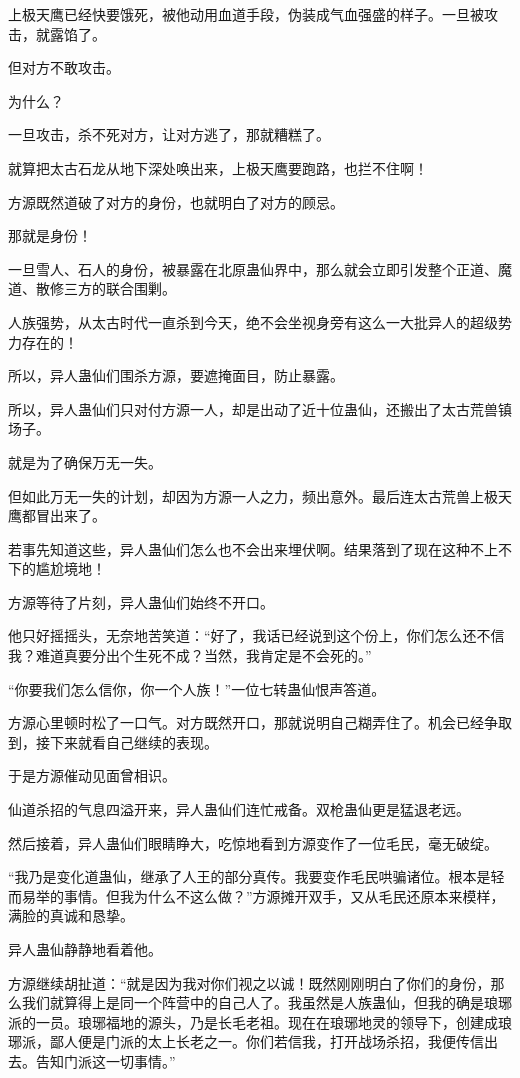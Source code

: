\begin{this_body}
上极天鹰已经快要饿死，被他动用血道手段，伪装成气血强盛的样子。一旦被攻击，就露馅了。

但对方不敢攻击。

为什么？

一旦攻击，杀不死对方，让对方逃了，那就糟糕了。

就算把太古石龙从地下深处唤出来，上极天鹰要跑路，也拦不住啊！

方源既然道破了对方的身份，也就明白了对方的顾忌。

那就是身份！

一旦雪人、石人的身份，被暴露在北原蛊仙界中，那么就会立即引发整个正道、魔道、散修三方的联合围剿。

人族强势，从太古时代一直杀到今天，绝不会坐视身旁有这么一大批异人的超级势力存在的！

所以，异人蛊仙们围杀方源，要遮掩面目，防止暴露。

所以，异人蛊仙们只对付方源一人，却是出动了近十位蛊仙，还搬出了太古荒兽镇场子。

就是为了确保万无一失。

但如此万无一失的计划，却因为方源一人之力，频出意外。最后连太古荒兽上极天鹰都冒出来了。

若事先知道这些，异人蛊仙们怎么也不会出来埋伏啊。结果落到了现在这种不上不下的尴尬境地！

方源等待了片刻，异人蛊仙们始终不开口。

他只好摇摇头，无奈地苦笑道：“好了，我话已经说到这个份上，你们怎么还不信我？难道真要分出个生死不成？当然，我肯定是不会死的。”

“你要我们怎么信你，你一个人族！”一位七转蛊仙恨声答道。

方源心里顿时松了一口气。对方既然开口，那就说明自己糊弄住了。机会已经争取到，接下来就看自己继续的表现。

于是方源催动见面曾相识。

仙道杀招的气息四溢开来，异人蛊仙们连忙戒备。双枪蛊仙更是猛退老远。

然后接着，异人蛊仙们眼睛睁大，吃惊地看到方源变作了一位毛民，毫无破绽。

“我乃是变化道蛊仙，继承了人王的部分真传。我要变作毛民哄骗诸位。根本是轻而易举的事情。但我为什么不这么做？”方源摊开双手，又从毛民还原本来模样，满脸的真诚和恳挚。

异人蛊仙静静地看着他。

方源继续胡扯道：“就是因为我对你们视之以诚！既然刚刚明白了你们的身份，那么我们就算得上是同一个阵营中的自己人了。我虽然是人族蛊仙，但我的确是琅琊派的一员。琅琊福地的源头，乃是长毛老祖。现在在琅琊地灵的领导下，创建成琅琊派，鄙人便是门派的太上长老之一。你们若信我，打开战场杀招，我便传信出去。告知门派这一切事情。”


\end{this_body}
